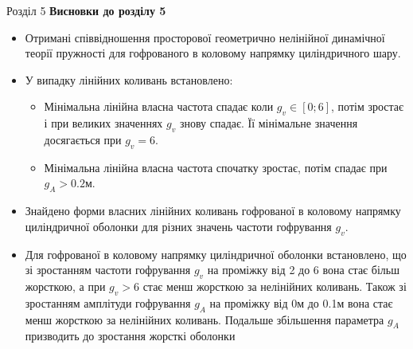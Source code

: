 \documentclass[8pt]{beamer}
\numberwithin{figure}{section}
\numberwithin{equation}{section}
\numberwithin{table}{section}
\begin{document}
\begin{frame}{Розділ 5}
\textbf{Висновки до розділу 5}\\
\vspace{1em}
\begin{itemize}
\item Отримані співвідношення просторової геометрично нелінійної динамічної теорії пружності для гофрованого в коловому напрямку циліндричного шару.
\item У випадку лінійних коливань встановлено:
\begin{itemize}
     \item Мінімальна лінійна власна частота спадає коли $g_v \in [0;6] $, потім зростає і при великих значеннях $g_v$ знову спадає. Її мінімальне значення досягається при $g_v = 6$. 
     \item Мінімальна лінійна власна частота спочатку зростає, потім спадає при $g_A > 0.2$м.
   \end{itemize}
 
\item Знайдено форми власних лінійних коливань гофрованої в коловому напрямку циліндричної оболонки для різних значень частоти гофрування $g_v$.
\item Для гофрованої в коловому напрямку циліндричної оболонки встановлено, що зі зростанням частоти гофрування $g_v$ на проміжку від 2 до 6 вона стає більш жорсткою, а при $g_v > 6$ стає менш жорсткою за нелінійних коливань. Також зі зростанням амплітуди гофрування $g_A$ на проміжку від 0м до 0.1м вона стає менш жорсткою за нелінійних коливань. Подальше збільшення параметра $g_A$ призводить до зростання жорсткі оболонки

\end{itemize}

\end{frame}
\end{document}
